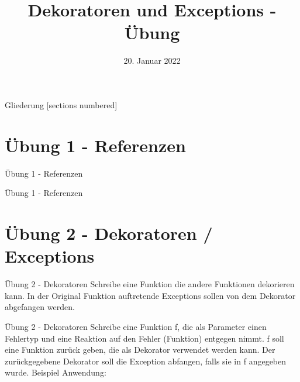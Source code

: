 



\title{Dekoratoren und Exceptions - Übung}
\date{20. Januar 2022}


\maketitle

\begin{frame}{Gliederung}
	[sections numbered]
	\tableofcontents
\end{frame}


\section{Übung 1 - Referenzen}
\begin{frame}{Übung 1 - Referenzen}
	
\end{frame}

\begin{frame}{Übung 1 - Referenzen}
	
\end{frame}

\section{Übung 2 - Dekoratoren / Exceptions}
\begin{frame}{Übung 2 - Dekoratoren}
	Schreibe eine Funktion die andere Funktionen dekorieren kann. In der Original Funktion auftretende Exceptions sollen von dem Dekorator abgefangen werden.	
\end{frame}

\begin{frame}{Übung 2 - Dekoratoren}
	Schreibe eine Funktion \alert{f}, die als Parameter einen Fehlertyp und eine Reaktion auf den Fehler (Funktion) entgegen nimmt. f soll eine Funktion zurück geben, die als Dekorator verwendet werden kann. Der zurückgegebene Dekorator soll die Exception abfangen, falls sie in f angegeben wurde.
	\linebreak\linebreak
	Beispiel Anwendung:
	
\end{frame}


